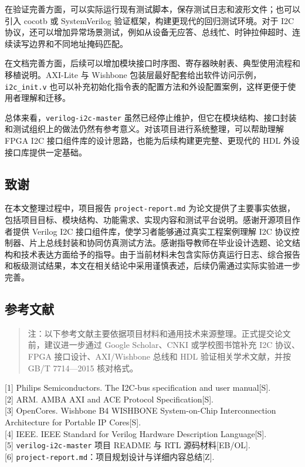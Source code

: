 在验证完善方面，可以实际运行现有测试脚本，保存测试日志和波形文件；也可以引入 cocotb 或 SystemVerilog 验证框架，构建更现代的回归测试环境。对于 I2C 协议，还可以增加异常场景测试，例如从设备无应答、总线忙、时钟拉伸超时、连续读写边界和不同地址掩码匹配。

在文档完善方面，后续可以增加模块接口时序图、寄存器映射表、典型使用流程和移植说明。AXI-Lite 与 Wishbone 包装层最好配套给出软件访问示例，\texttt{i2c\_init.v} 也可以补充初始化指令表的配置方法和外设配置案例，这样更便于使用者理解和迁移。

总体来看，\texttt{verilog-i2c-master} 虽然已经停止维护，但它在模块结构、接口封装和测试组织上的做法仍然有参考意义。对该项目进行系统整理，可以帮助理解 FPGA I2C 接口组件库的设计思路，也能为后续构建更完整、更现代的 HDL 外设接口库提供一定基础。

\subsection{致谢}\label{ux81f4ux8c22}

在本文整理过程中，项目报告 \texttt{project-report.md} 为论文提供了主要事实依据，包括项目目标、模块结构、功能需求、实现内容和测试平台说明。感谢开源项目作者提供 Verilog I2C 接口组件库，使学习者能够通过真实工程案例理解 I2C 协议控制器、片上总线封装和协同仿真测试方法。感谢指导教师在毕业设计选题、论文结构和技术表达方面给予的指导。由于当前材料未包含实际仿真运行日志、综合报告和板级测试结果，本文在相关结论中采用谨慎表述，后续仍需通过实际实验进一步完善。

\subsection{参考文献}\label{ux53c2ux8003ux6587ux732e}

\begin{quote}
注：以下参考文献主要依据项目材料和通用技术来源整理。正式提交论文前，建议进一步通过 Google Scholar、CNKI 或学校图书馆补充 I2C 协议、FPGA 接口设计、AXI/Wishbone 总线和 HDL 验证相关学术文献，并按 GB/T 7714---2015 核对格式。
\end{quote}

{[}1{]} Philips Semiconductors. The I2C-bus specification and user manual{[}S{]}.\\
{[}2{]} ARM. AMBA AXI and ACE Protocol Specification{[}S{]}.\\
{[}3{]} OpenCores. Wishbone B4 WISHBONE System-on-Chip Interconnection Architecture for Portable IP Cores{[}S{]}.\\
{[}4{]} IEEE. IEEE Standard for Verilog Hardware Description Language{[}S{]}.\\
{[}5{]} \texttt{verilog-i2c-master} 项目 README 与 RTL 源码材料{[}EB/OL{]}.\\
{[}6{]} \texttt{project-report.md}：项目规划设计与详细内容总结{[}Z{]}.

